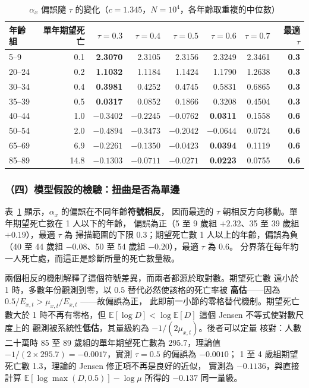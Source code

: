 \documentclass[UTF8, fontset=macnew, a4paper, 12pt]{ctexart}
\newcommand{\cn}[1]{\ding{\number\numexpr171+#1\relax}}
\begin{document}
\begin{table}[H]
\centering
\caption{$\alpha_x$ 偏誤隨 $\tau$ 的變化（$c=1.345$，$N=10^4$，各年齡取重複的中位數）}
\small
\begin{tabular}{lrrrrrrr}
\toprule
年齡組 & 單年期望死亡 & $\tau=0.3$ & $\tau=0.4$ & $\tau=0.5$ & $\tau=0.6$ & $\tau=0.7$ & 最適 $\tau$\\
\midrule
5--9   & \phantom{00}0.1 & \textbf{2.3070} & 2.3105 & 2.3156 & 2.3249 & 2.3461 & \textbf{0.3}\\
20--24 & \phantom{00}0.2 & \textbf{1.1032} & 1.1184 & 1.1424 & 1.1790 & 1.2638 & \textbf{0.3}\\
30--34 & \phantom{00}0.4 & \textbf{0.3981} & 0.4252 & 0.4745 & 0.5831 & 0.6865 & \textbf{0.3}\\
35--39 & \phantom{00}0.5 & \textbf{0.0317} & 0.0852 & 0.1866 & 0.3208 & 0.4504 & \textbf{0.3}\\
\midrule
40--44 & \phantom{00}1.0 & $-0.3402$ & $-0.2245$ & $-0.0762$ & \textbf{0.0311} & 0.1558 & \textbf{0.6}\\
50--54 & \phantom{00}2.0 & $-0.4894$ & $-0.3473$ & $-0.2042$ & \textbf{$-0.0644$} & 0.0724 & \textbf{0.6}\\
65--69 & \phantom{00}6.9 & $-0.2261$ & $-0.1350$ & $-0.0423$ & \textbf{0.0394} & 0.1119 & \textbf{0.6}\\
85--89 & \phantom{0}14.8 & $-0.1303$ & $-0.0711$ & $-0.0271$ & \textbf{0.0223} & 0.0755 & \textbf{0.6}\\
\bottomrule
\end{tabular}
\label{tab:mqage}
\end{table}

\subsubsection{（四）模型假設的檢驗：扭曲是否為單邊}

表~\ref{tab:mqage} 顯示，$\alpha_x$ 的偏誤在不同年齡\textbf{符號相反}，
因而最適的 $\tau$ 朝相反方向移動。單年期望死亡數在 1 人以下的年齡，
偏誤為正（5 至 9 歲組 $+2.32$、35 至 39 歲組 $+0.19$），最適 $\tau$ 為
掃描範圍的下限 0.3；期望死亡數 1 人以上的年齡，偏誤為負
（40 至 44 歲組 $-0.08$、50 至 54 歲組 $-0.20$），最適 $\tau$ 為 0.6。
分界落在每年約一人死亡處，而這正是診斷\cn{1}所量的死亡數量級。

兩個相反的機制解釋了這個符號差異，而兩者都源於取對數。期望死亡數
遠小於 1 時，多數年份觀測到零，以 0.5 替代必然使該格的死亡率被
\textbf{高估}——因為 $0.5/E_{x,t}>\mu_{x,t}/E_{x,t}$ ——故偏誤為正，
此即前一小節的零格替代機制。期望死亡數大於 1 時不再有零格，但
$\mathbb{E}[\log D]<\log\mathbb{E}[D]$ 這個 Jensen 不等式使對數尺度上的
觀測被系統性\textbf{低估}，其量級約為 $-1/(2\mu_{x,t})$。後者可以定量
核對：人數二十萬時 85 至 89 歲組的單年期望死亡數為 295.7，理論值
$-1/(2\times295.7)=-0.0017$，實測 $\tau=0.5$ 的偏誤為 $-0.0010$；
1 至 4 歲組期望死亡數 1.3，理論的 Jensen 修正項不再是良好的近似，
實測為 $-0.1136$，與直接計算 $\mathbb{E}[\log\max(D,0.5)]-\log\mu$
所得的 $-0.137$ 同一量級。
\end{document}
